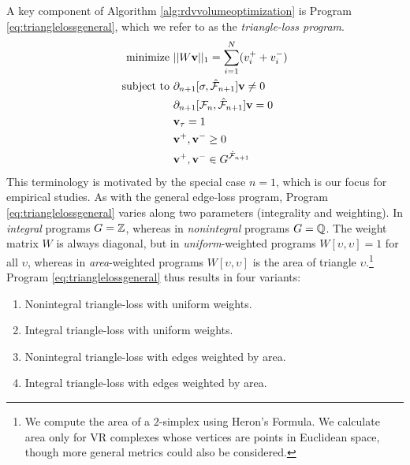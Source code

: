 A key component of Algorithm \ref{alg:rdvvolumeoptimization} is Program \eqref{eq:trianglelossgeneral}, which we refer to as the \emph{triangle-loss program}.
\begin{align}
\begin{split}
 \text{minimize } & ||W \mathbf{v} ||_1 = \sum_{i=1}^N (v_i^+ + v_i^-)  \\
\text{subject to } &  \partial_{n+1}[ \sigma , \hat {\mathcal{F}}_{n+1} ] \mathbf{v} \neq 0     \\
&  \partial_{n+1}[\mathcal{F}_n, \hat {\mathcal{F}}_{n+1} ] \mathbf{v} = 0 \\
 & \mathbf{v}_{\tau} = 1\\
     & \mathbf{v}^+, \mathbf{v}^- \ge 0 \\
& \mathbf{v}^+, \mathbf{v}^- \in G^{ \hat {\mathcal{F}}_{n+1}}
\end{split}
\label{eq:trianglelossgeneral}
\end{align} 
This terminology is motivated by the special case $n=1$, which is our focus for  empirical studies.  As with the general edge-loss program, Program \eqref{eq:trianglelossgeneral} varies along two  parameters (integrality and weighting).  In \emph{integral} programs $G = \mathbb{Z}$, whereas in \emph{nonintegral} programs $G = \mathbb{Q}$.  The weight matrix $W$ is always diagonal, but in \emph{uniform}-weighted programs $W[\upsilon, \upsilon] = 1$ for all $\upsilon$, whereas in \emph{area}-weighted programs $W[\upsilon, \upsilon]$ is the area of triangle $\upsilon$.\footnote{We compute the area of a $2$-simplex using Heron's Formula.  We calculate area only for VR complexes whose vertices are points in Euclidean space, though more general metrics could also be considered.} Program \eqref{eq:trianglelossgeneral} thus results in four variants:
 
 
\begin{enumerate}[style=multiline]
    \item[\namedlabel{itm:tri_NIU}{$\Tri\NI\unif$}] Nonintegral triangle-loss with uniform weights.
    \item[\namedlabel{itm:tri_IU}{$\Tri\I\unif$}] Integral triangle-loss with uniform weights.
    \item[\namedlabel{itm:tri_NIA}{$\Tri\NI\area$}] Nonintegral triangle-loss with edges weighted by area.
    \item[\namedlabel{itm:tri_IA}{$\Tri\I\area$}] Integral triangle-loss with edges weighted by area. 
\end{enumerate}
 
